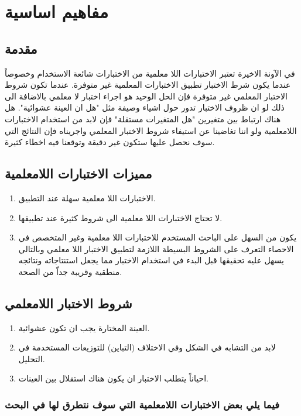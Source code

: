 \chapter{مفاهيم اساسية}

\section{مقدمة}
في الآونة الاخيرة تعتبر الاختبارات اللا معلمية من الاختبارات شائعة الاستخدام وخصوصاً عندما يكون شرط الاختبار تطبيق الاختبارات المعلمية غير متوفرة. عندما تكون شروط الاختبار المعلمي غير متوفرة فإن الحل الوحيد هو اجراء اختبار لا معلمي بالاضافة الى ذلك لو ان ظروف الاختبار تدور حول اشياء وصيفة مثل "هل ان العينة عشوائية". هل هناك ارتباط بين متغيرين "هل المتغيرات مستقلة" فإن لابد من استخدام الاختبارات اللامعلمية ولو اننا تغاضينا عن استيفاء شروط الاختبار المعلمي واجريناه فإن النتائج التي سوف نحصل عليها ستكون غير دقيقة وتوقعنا فيه اخطاء كثيرة.

\section{مميزات الاختبارات اللامعلمية}

\begin{enumerate}
	\item الاختبارات اللا معلمية سهلة عند التطبيق.
	\item لا تحتاج الاختبارات اللا معلمية الى شروط كثيرة عند تطبيقها.
	\item يكون من السهل على الباحث المستخدم للاختبارات اللا معلمية وغير المتخصص في الاحصاء التعرف على الشروط البسيطة اللازمة لتطبيق الاختبار اللا معلمي وبالتالي يسهل عليه تحقيقها قبل البدء في استخدام الاختبار مما يجعل استنتاجاته ونتائجه منطقية وقريبة جداّ من الصحة.
\end{enumerate}

\section{شروط الاختبار اللامعلمي}

\begin{enumerate}
	\item العينة المختارة يجب ان تكون عشوائية.
	\item لابد من التشابه في الشكل وفي الاختلاف (التباين) للتوزيعات المستخدمة في التحليل.
	\item احياناً يتطلب الاختبار ان يكون هناك استقلال بين العينات.
\end{enumerate}

\subsection*{فيما يلي بعض الاختبارات اللامعلمية التي سوف نتطرق لها في البحث}

